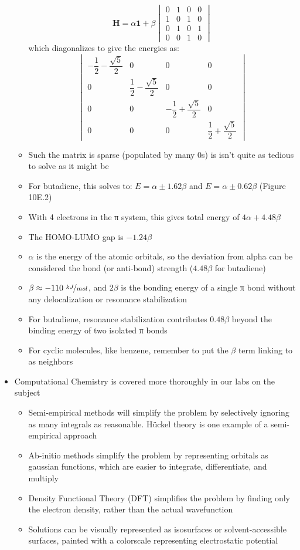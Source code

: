 \documentclass[12pt, openany, letterpaper]{memoir}
\begin{document}
\begin{itemize}
\begin{itemize}
		\[\mathbf{H} = \alpha\mathbf{1} + \beta
		\begin{vmatrix} 
		0 & 1 & 0 & 0 \\
		1 & 0 & 1 & 0 \\
		0 & 1 & 0 & 1 \\
		0 & 0 & 1 & 0
		\end{vmatrix}\] which diagonalizes to give the energies as:
		\[\begin{vmatrix} 
		-\dfrac{1}{2}-\dfrac{\sqrt{5}}{2} & 0 & 0 & 0 \\
		0 & \dfrac{1}{2}-\dfrac{\sqrt{5}}{2} & 0 & 0 \\
		0 & 0 & -\dfrac{1}{2}+\dfrac{\sqrt{5}}{2} & 0 \\
		0 & 0 & 0 & \dfrac{1}{2}+\dfrac{\sqrt{5}}{2}
		\end{vmatrix}\]
		\item Such the matrix is sparse (populated by many 0s) is isn't quite as tedious to solve as it might be
		\item For butadiene, this solves to: $E= \alpha\pm1.62\beta$ and $E=\alpha\pm0.62\beta$ (Figure 10E.2)
		\item With 4 electrons in the π system, this gives total energy of $4\alpha +4.48\beta$
		\item The HOMO-LUMO gap is $-1.24\beta$
		\item $\alpha$ is the energy of the atomic orbitals, so the deviation from alpha can be considered the bond (or anti-bond) strength ($4.48\beta$ for butadiene)
		\item $\beta \approx -110~\nicefrac{kJ}{mol}$, and $2\beta$ is the bonding energy of a single π bond without any delocalization or resonance stabilization
		\item For butadiene, resonance stabilization contributes $0.48\beta$ beyond the binding energy of two isolated π bonds
		\item For cyclic molecules, like benzene, remember to put the $\beta$ term linking  to  as neighbors
	\end{itemize}
	\item Computational Chemistry is covered more thoroughly in our labs on the subject
	\begin{itemize}
		\item Semi-empirical methods will simplify the problem by selectively ignoring as many integrals as reasonable. H\"uckel theory is one example of a semi-empirical approach
		\item Ab-initio methods simplify the problem by representing orbitals as gaussian functions, which are easier to integrate, differentiate, and multiply
		\item Density Functional Theory (DFT) simplifies the problem by finding only the electron density, rather than the actual wavefunction
		\item Solutions can be visually represented as isosurfaces or solvent-accessible surfaces, painted with a colorscale representing electrostatic potential
	\end{itemize}
\end{itemize}
\end{document}
